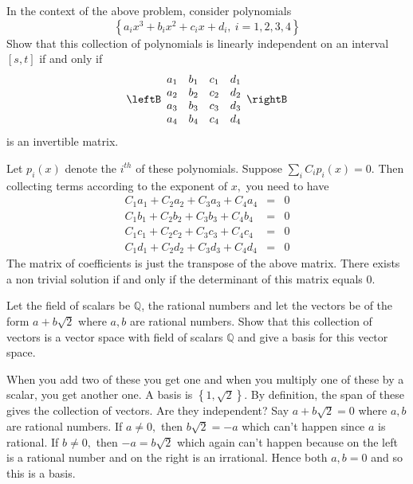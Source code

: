 \begin{enumialphparenastyle}
\begin{ex} In the context of the above problem, consider polynomials 
\begin{equation*}
\left\{ a_{i}x^{3}+b_{i}x^{2}+c_{i}x+d_{i},\ i=1,2,3,4\right\}
\end{equation*}
Show that this collection of polynomials is linearly independent on an
interval $\left[ s,t\right] $ if and only if 
\begin{equation*}
\leftB
\begin{array}{cccc}
a_{1} & b_{1} & c_{1} & d_{1} \\ 
a_{2} & b_{2} & c_{2} & d_{2} \\ 
a_{3} & b_{3} & c_{3} & d_{3} \\ 
a_{4} & b_{4} & c_{4} & d_{4}
\end{array}
\rightB
\end{equation*}
is an invertible matrix.
\begin{sol}
Let $p_{i}\left( x\right) $ denote the $i^{th}$ of
these polynomials. Suppose $\sum_{i}C_{i}p_{i}\left( x\right) =0.$ Then
collecting terms according to the exponent of $x,$ you need to have
\begin{eqnarray*}
C_{1}a_{1}+C_{2}a_{2}+C_{3}a_{3}+C_{4}a_{4} &=&0 \\
C_{1}b_{1}+C_{2}b_{2}+C_{3}b_{3}+C_{4}b_{4} &=&0 \\
C_{1}c_{1}+C_{2}c_{2}+C_{3}c_{3}+C_{4}c_{4} &=&0 \\
C_{1}d_{1}+C_{2}d_{2}+C_{3}d_{3}+C_{4}d_{4} &=&0
\end{eqnarray*}
The matrix of coefficients is just the transpose of the above matrix. There
exists a non trivial solution if and only if the determinant of this matrix
equals 0.
\end{sol}
\end{ex}

\begin{ex} Let the field of scalars be $\mathbb{Q}$, the rational numbers and let
the vectors be of the form $a+b\sqrt{2}$ where $a,b$ are rational numbers.
Show that this collection of vectors is a vector space with field of scalars 
$\mathbb{Q}$ and give a basis for this vector space.
\begin{sol}
When you add two of these you get one and when you multiply one of these by
a scalar, you get another one. A basis is $\left\{ 1,\sqrt{2}\right\} $. By
definition, the span of these gives the collection of vectors. Are they
independent? Say $a+b\sqrt{2}=0$ where $a,b$ are rational numbers. If $a\neq
0,$ then $b\sqrt{2}=-a$ which can't happen since $a$ is rational. If $b\neq
0,$ then $-a=b\sqrt{2}$ which again can't happen because on the left is a
rational number and on the right is an irrational. Hence both $a,b=0$ and so
this is a basis.
\end{sol}
\end{ex}


\end{enumialphparenastyle}
